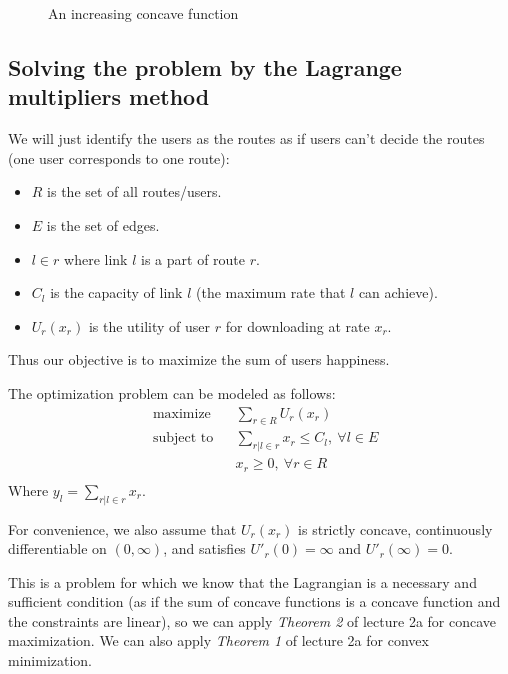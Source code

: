 \begin{figure}[h]
	\centering
	\caption{An increasing concave function} \label{fig:2}
\end{figure}
\subsection{Solving the problem by the Lagrange multipliers method}
We will just identify the users as the routes as if users can't decide the routes (one user corresponds to one route):
\begin{itemize}
	\item $R$ is the set of all routes/users.
	\item $E$ is the set of edges.
	\item $l \in r$ where link $l$ is a part of route $r$.
	\item $C_l$ is the capacity of link $l$ (the maximum rate that $l$ can achieve).
	\item $U_r(x_r)$ is the utility of user $r$ for downloading at rate $x_r$.
\end{itemize}
Thus our objective is to maximize the sum of users happiness.

The optimization problem can be modeled as follows:
\begin{equation}
\begin{aligned}
& {\text{maximize}}
& &  \sum_{r \in R} U_{r}(x_{r}) \\
& \text{subject to}
& & \sum\limits_{r|l \in r} x_{r} \leq C_{l},\ \forall l \in E\\
&      &&  x_{r} \geq 0,\ \forall r \in R\\
\end{aligned}
\label{Max}
\end{equation}
Where $y_l=\sum\limits_{r | l \in r} x_r$.

For convenience, we also assume that $U_r(x_r)$ is strictly concave, continuously differentiable on $(0,\infty)$, and satisfies $U'_r(0) = \infty$ and $U'_r(\infty) = 0$.

This is a problem for which we know that the Lagrangian is a necessary and sufficient condition (as if the sum of concave functions is a concave function and the constraints are linear), so we can apply \textit{Theorem 2} of lecture 2a for concave maximization. We can also apply \textit{Theorem 1} of lecture 2a for convex minimization.

